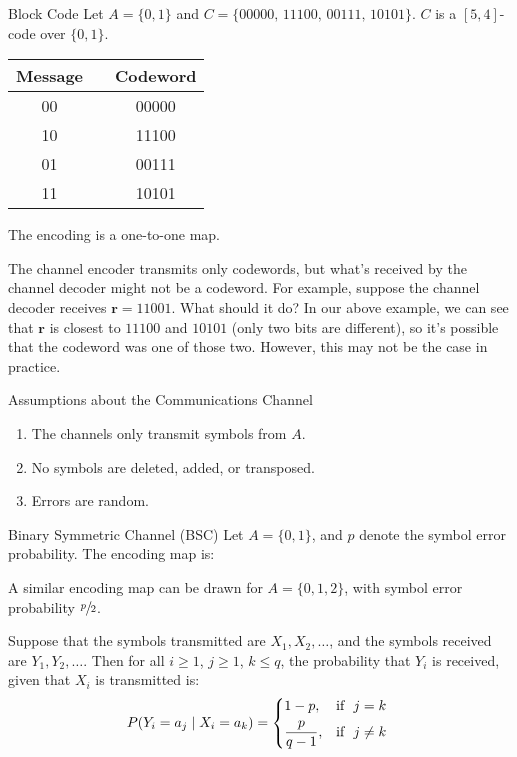 \begin{Example}{Block Code}{}
    Let $ A=\{0,1\} $ and $ C=\{00000,\,11100,\,00111,\,10101\} $.
    $ C $ is a $ [5,4] $-code over $ \{0,1\} $.
    \begin{table}[H]
        \centering
        \begin{tabular}{@{}ccc@{}}
            Message & \textrightarrow{} & Codeword \\
            \midrule
            00      & \textrightarrow{} & 00000    \\
            10      & \textrightarrow{} & 11100    \\
            01      & \textrightarrow{} & 00111    \\
            11      & \textrightarrow{} & 10101    \\
        \end{tabular}
    \end{table}
    The encoding is a one-to-one map.
\end{Example}

The channel encoder transmits only codewords, but what's received by the channel
decoder might not be a codeword. For example, suppose the channel decoder
receives $ \bm{r}=11001 $. What should it do? In our above example, we can see
that $ \bm{r} $ is closest to $ 11100 $ and $ 10101 $ (only two bits are different),
so it's possible that the codeword was one of those two. However,
this may not be the case in practice.

\begin{Definition}{Assumptions about the Communications Channel}{}
    \begin{enumerate}[label=(\Roman*)]
        \item The channels only transmit symbols from $ A $.
        \item No symbols are deleted, added, or transposed.
        \item Errors are random.
    \end{enumerate}
\end{Definition}

\begin{Example}{Binary Symmetric Channel (BSC)}{}
    Let $ A=\{0,1\} $, and $ p $ denote the symbol error probability.
    The encoding map is:
    \begin{center}
        
    \end{center}
    A similar encoding map can be drawn for $ A=\{0,1,2\} $,
    with symbol error probability $ \sfrac{p}{2} $.

    Suppose that the symbols transmitted are $ X_1,X_2,\ldots $,
    and the symbols received are $ Y_1,Y_2,\ldots $. Then for all
    $ i\geqslant 1 $, $ j\geqslant 1 $, $ k\leqslant q $, the probability
    that $ Y_i $ is received, given that $ X_i $ is transmitted is:
    \[ P(Y_i=a_j\mid X_i=a_k)=
        \begin{dcases*}
            1-p,            & \text{if } $ j=k $     \\
            \frac{p}{q-1}, & \text{if } $ j\neq{}k $
        \end{dcases*} \]
\end{Example}

